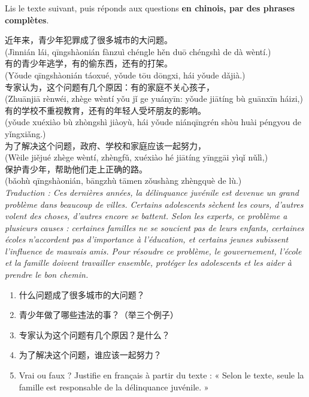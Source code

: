 \documentclass[11pt]{article}
\begin{document}
\begin{exercice}
Lis le texte suivant, puis réponds aux questions \textbf{en chinois, par des phrases complètes}.

\begin{textebox}[青少年犯罪的问题]
近年来，青少年犯罪成了很多城市的大问题。\\ (Jìnnián lái, qīngshàonián fànzuì chéngle hěn duō chéngshì de dà wèntí.)\\
有的青少年逃学，有的偷东西，还有的打架。\\ (Yǒude qīngshàonián táoxué, yǒude tōu dōngxi, hái yǒude dǎjià.)\\
专家认为，这个问题有几个原因：有的家庭不关心孩子，\\ (Zhuānjiā rènwéi, zhège wèntí yǒu jǐ ge yuányīn: yǒude jiātíng bù guānxīn háizi,)\\
有的学校不重视教育，还有的年轻人受坏朋友的影响。\\ (yǒude xuéxiào bù zhòngshì jiàoyù, hái yǒude niánqīngrén shòu huài péngyou de yǐngxiǎng.)\\
为了解决这个问题，政府、学校和家庭应该一起努力，\\ (Wèile jiějué zhège wèntí, zhèngfǔ, xuéxiào hé jiātíng yīnggāi yìqǐ nǔlì,)\\
保护青少年，帮助他们走上正确的路。\\ (bǎohù qīngshàonián, bāngzhù tāmen zǒushàng zhèngquè de lù.)\\
\emph{Traduction : Ces dernières années, la délinquance juvénile est devenue un grand problème dans beaucoup de villes. Certains adolescents sèchent les cours, d'autres volent des choses, d'autres encore se battent. Selon les experts, ce problème a plusieurs causes : certaines familles ne se soucient pas de leurs enfants, certaines écoles n'accordent pas d'importance à l'éducation, et certains jeunes subissent l'influence de mauvais amis. Pour résoudre ce problème, le gouvernement, l'école et la famille doivent travailler ensemble, protéger les adolescents et les aider à prendre le bon chemin.}
\end{textebox}

\begin{enumerate}
\item 什么问题成了很多城市的大问题？
\item 青少年做了哪些违法的事？（举三个例子）
\item 专家认为这个问题有几个原因？是什么？
\item 为了解决这个问题，谁应该一起努力？
\item Vrai ou faux ? Justifie en français à partir du texte : « Selon le texte, seule la famille est responsable de la délinquance juvénile. »
\end{enumerate}
\end{exercice}
\end{document}

